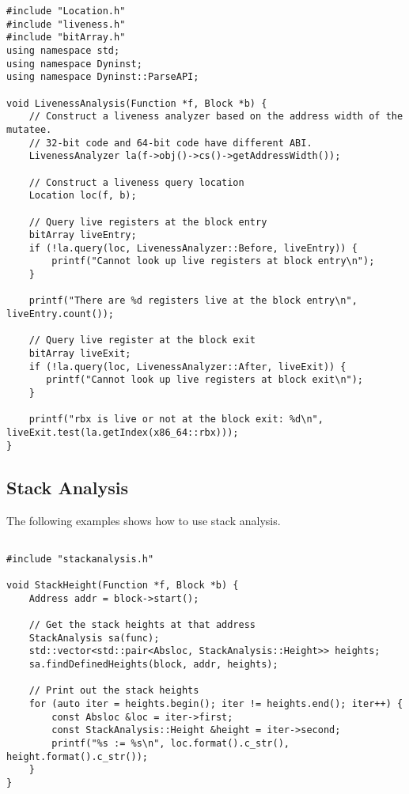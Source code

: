 \lstset{numbers=left, numberstyle=\tiny, stepnumber=5, numbersep=5pt}
\lstset{showstringspaces=false}
\begin{lstlisting}
#include "Location.h"
#include "liveness.h"
#include "bitArray.h"
using namespace std;
using namespace Dyninst;
using namespace Dyninst::ParseAPI;

void LivenessAnalysis(Function *f, Block *b) {   
    // Construct a liveness analyzer based on the address width of the mutatee.
    // 32-bit code and 64-bit code have different ABI.
    LivenessAnalyzer la(f->obj()->cs()->getAddressWidth());
   
    // Construct a liveness query location
    Location loc(f, b);
   
    // Query live registers at the block entry
    bitArray liveEntry;
    if (!la.query(loc, LivenessAnalyzer::Before, liveEntry)) {
        printf("Cannot look up live registers at block entry\n");
    }

    printf("There are %d registers live at the block entry\n", liveEntry.count());

    // Query live register at the block exit
    bitArray liveExit;
    if (!la.query(loc, LivenessAnalyzer::After, liveExit)) {
       printf("Cannot look up live registers at block exit\n");
    }

    printf("rbx is live or not at the block exit: %d\n", liveExit.test(la.getIndex(x86_64::rbx)));
}
\end{lstlisting}

\subsection{Stack Analysis}
The following examples shows how to use stack analysis.

\lstset{numbers=left, numberstyle=\tiny, stepnumber=5, numbersep=5pt}
\lstset{showstringspaces=false}
\begin{lstlisting}

#include "stackanalysis.h"

void StackHeight(Function *f, Block *b) {
    Address addr = block->start();

    // Get the stack heights at that address
    StackAnalysis sa(func);
    std::vector<std::pair<Absloc, StackAnalysis::Height>> heights;
    sa.findDefinedHeights(block, addr, heights);

    // Print out the stack heights
    for (auto iter = heights.begin(); iter != heights.end(); iter++) {
        const Absloc &loc = iter->first;
        const StackAnalysis::Height &height = iter->second;
        printf("%s := %s\n", loc.format().c_str(), height.format().c_str());
    }
}

\end{lstlisting}

